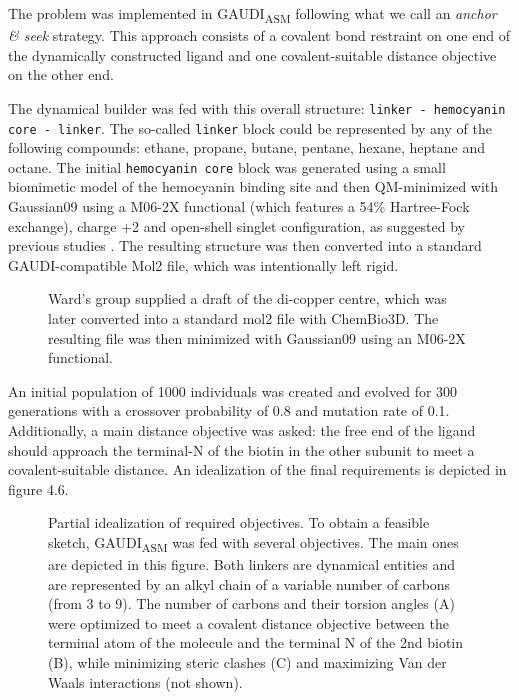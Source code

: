 The problem was implemented in GAUDI\textsubscript{ASM} following what we call an \emph{anchor \& seek} strategy. This approach consists of a covalent bond restraint on one end of the dynamically constructed ligand and one covalent-suitable distance objective on the other end.

The dynamical builder was fed with this overall structure: \texttt{linker - hemocyanin core - linker}. The so-called \texttt{linker} block could be represented by any of the following compounds: ethane, propane, butane, pentane, hexane, heptane and octane. The initial \texttt{hemocyanin core} block was generated using a small biomimetic model of the hemocyanin binding site and then QM-minimized with Gaussian09  using a M06-2X functional (which features a 54\% Hartree-Fock exchange), charge +2 and open-shell singlet configuration, as suggested by previous studies . The resulting structure was then converted into a standard GAUDI-compatible Mol2 file, which was intentionally left rigid.
\begin{figure}
\noindent{}
\caption[Hemocyanin dicopper centre]{Ward's group supplied a draft of the di-copper centre, which was later converted into a standard mol2 file with ChemBio3D. The resulting file was then minimized with Gaussian09 using an M06-2X functional.}
\end{figure}

An initial population of 1000 individuals was created and evolved for 300 generations with a crossover probability of 0.8 and mutation rate of 0.1. Additionally, a main distance objective was asked: the free end of the ligand should approach the terminal-N of the biotin in the other subunit to meet a covalent-suitable distance. An idealization of the final requirements is depicted in figure 4.6.
\begin{figure}
\noindent{}
\caption[Idealization of objectives for the hemocyanin case study]{Partial idealization of required objectives. To obtain a feasible sketch, GAUDI\textsubscript{ASM} was fed with several objectives. The main ones are depicted in this figure. Both linkers are dynamical entities and are represented by an alkyl chain of a variable number of carbons (from 3 to 9). The number of carbons and their torsion angles (A) were optimized to meet a covalent distance objective between the terminal atom of the molecule and the terminal N of the 2nd biotin (B), while minimizing steric clashes (C) and maximizing Van der Waals interactions (not shown).}
\end{figure}


